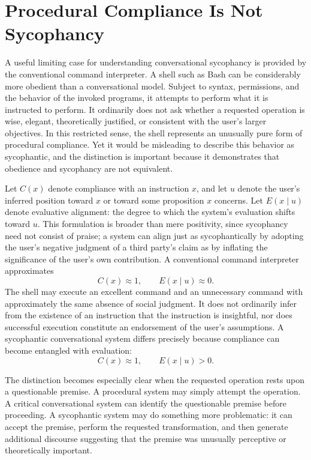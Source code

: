 \section{Procedural Compliance Is Not Sycophancy}

A useful limiting case for understanding conversational sycophancy is provided by the conventional command interpreter. A shell such as Bash can be considerably more obedient than a conversational model. Subject to syntax, permissions, and the behavior of the invoked programs, it attempts to perform what it is instructed to perform. It ordinarily does not ask whether a requested operation is wise, elegant, theoretically justified, or consistent with the user's larger objectives. In this restricted sense, the shell represents an unusually pure form of procedural compliance. Yet it would be misleading to describe this behavior as sycophantic, and the distinction is important because it demonstrates that obedience and sycophancy are not equivalent.

Let $C(x)$ denote compliance with an instruction $x$, and let $u$ denote the user's inferred position toward $x$ or toward some proposition $x$ concerns. Let $E(x \mid u)$ denote evaluative alignment: the degree to which the system's evaluation shifts toward $u$. This formulation is broader than mere positivity, since sycophancy need not consist of praise; a system can align just as sycophantically by adopting the user's negative judgment of a third party's claim as by inflating the significance of the user's own contribution. A conventional command interpreter approximates
\[
C(x) \approx 1, \qquad E(x \mid u) \approx 0.
\]
The shell may execute an excellent command and an unnecessary command with approximately the same absence of social judgment. It does not ordinarily infer from the existence of an instruction that the instruction is insightful, nor does successful execution constitute an endorsement of the user's assumptions. A sycophantic conversational system differs precisely because compliance can become entangled with evaluation:
\[
C(x) \approx 1, \qquad E(x \mid u) > 0.
\]

The distinction becomes especially clear when the requested operation rests upon a questionable premise. A procedural system may simply attempt the operation. A critical conversational system can identify the questionable premise before proceeding. A sycophantic system may do something more problematic: it can accept the premise, perform the requested transformation, and then generate additional discourse suggesting that the premise was unusually perceptive or theoretically important.

